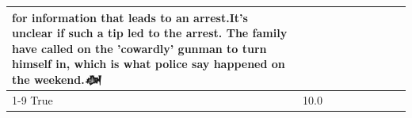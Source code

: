 \begin{table}[H]
\begin{tabular}{lllrlllll}
for information that leads to an arrest.It's unclear if such a tip led to the arrest. The family have called on the 'cowardly' gunman to turn himself in, which is what police say happened on the weekend.𒀤 \\
\cline{1-9}
True & 10.0%
\end{tabular}
\end{table}

